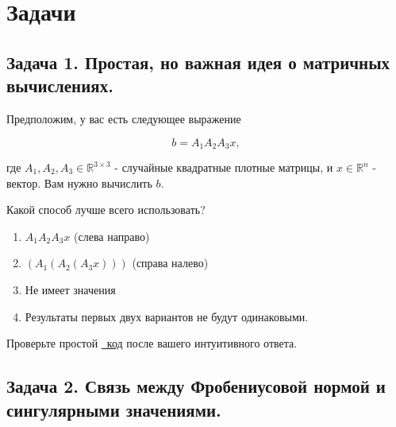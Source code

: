 \documentclass[
  russian,
  letterpaper,
  DIV=11,
  numbers=noendperiod]{scrartcl}
\providecommand{\tightlist}{%
  \setlength{\itemsep}{0pt}\setlength{\parskip}{0pt}}
\begin{document}
\section{Задачи}\label{ux437ux430ux434ux430ux447ux438}

\subsection{Задача 1. Простая, но важная идея о матричных
вычислениях.}\label{ux437ux430ux434ux430ux447ux430-1.-ux43fux440ux43eux441ux442ux430ux44f-ux43dux43e-ux432ux430ux436ux43dux430ux44f-ux438ux434ux435ux44f-ux43e-ux43cux430ux442ux440ux438ux447ux43dux44bux445-ux432ux44bux447ux438ux441ux43bux435ux43dux438ux44fux445.}

Предположим, у вас есть следующее выражение

\[
b = A_1 A_2 A_3 x,
\]

где \(A_1, A_2, A_3 \in \mathbb{R}^{3 \times 3}\) - случайные квадратные
плотные матрицы, и \(x \in \mathbb{R}^n\) - вектор. Вам нужно вычислить
\(b\).

Какой способ лучше всего использовать?

\begin{enumerate}
\def\labelenumi{\arabic{enumi}.}
\tightlist
\item
  \(A_1 A_2 A_3 x\) (слева направо)
\item
  \(\left(A_1 \left(A_2 \left(A_3 x\right)\right)\right)\) (справа
  налево)
\item
  Не имеет значения
\item
  Результаты первых двух вариантов не будут одинаковыми.
\end{enumerate}

Проверьте простой
\href{https://colab.research.google.com/github/MerkulovDaniil/optim/blob/master/assets/Notebooks/stupid_important_idea_on_mm.ipynb}{\faPython~код}
после вашего интуитивного ответа.

\subsection{Задача 2. Связь между Фробениусовой нормой и сингулярными
значениями.}\label{ux437ux430ux434ux430ux447ux430-2.-ux441ux432ux44fux437ux44c-ux43cux435ux436ux434ux443-ux444ux440ux43eux431ux435ux43dux438ux443ux441ux43eux432ux43eux439-ux43dux43eux440ux43cux43eux439-ux438-ux441ux438ux43dux433ux443ux43bux44fux440ux43dux44bux43cux438-ux437ux43dux430ux447ux435ux43dux438ux44fux43cux438.}
\end{document}
